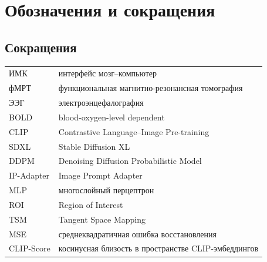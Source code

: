 \cleardoublepage
{}
{}
\section*{Обозначения и сокращения}

\subsection*{Сокращения}
\begin{tabular}{p{}p{}}
ИМК & интерфейс мозг--компьютер \\
фМРТ & функциональная магнитно-резонансная томография \\
ЭЭГ & электроэнцефалография \\
BOLD & blood-oxygen-level dependent \\
CLIP & Contrastive Language--Image Pre-training \\
SDXL & Stable Diffusion XL \\
DDPM & Denoising Diffusion Probabilistic Model \\
IP-Adapter & Image Prompt Adapter \\
MLP & многослойный перцептрон \\
ROI & Region of Interest \\
TSM & Tangent Space Mapping \\
MSE & среднеквадратичная ошибка восстановления \\
CLIP-Score & косинусная близость в пространстве CLIP-эмбеддингов \\
\end{tabular}

\vspace{1em}
